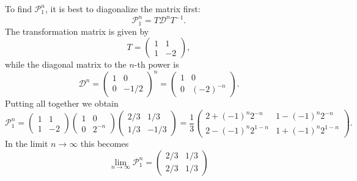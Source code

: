 \documentclass{gulartcl}
\begin{document}
To find $\mathcal{P}_1^{n}$, it is best to diagonalize the matrix first:
\begin{equation}
    \mathcal{P}_{1}^{n} = T \mathcal{D}^{n} T^{-1}.
\end{equation}
The transformation matrix is given by
\begin{equation}
    T =
    \begin{pmatrix}
        1 & 1 \\
        1 & -2
    \end{pmatrix},
\end{equation}
while the diagonal matrix to the $n$-th power is
\begin{equation}
    \mathcal{D}^{n} =
    \begin{pmatrix}
        1 & 0 \\
        0 & -1/2
    \end{pmatrix}^n
    =
    \begin{pmatrix}
        1 & 0 \\
        0 & (-2)^{-n}
    \end{pmatrix}.
\end{equation}
Putting all together we obtain
\begin{equation}
    \mathcal{P}_{1}^{n} =
    \begin{pmatrix}
        1 & 1 \\
        1 & -2
    \end{pmatrix}
    \begin{pmatrix}
        1 & 0 \\
        0 & 2^{-n}
    \end{pmatrix}
    \begin{pmatrix}
        2/3 & 1/3 \\
        1/3 & -1/3
    \end{pmatrix}
    =\frac{1}{3}
    \begin{pmatrix}
        2 + (-1)^{n} 2^{-n} & 1 - (-1)^{n} 2^{-n} \\
        2 - (-1)^{n} 2^{1-n} & 1 + (-1)^{n} 2^{1-n}
    \end{pmatrix}.
\end{equation}
In the limit $n\to \infty$ this becomes
\begin{equation}
    \lim_{n \to \infty} \mathcal{P}_{1}^{n} =
    \begin{pmatrix}
        2/3 & 1/3 \\
        2/3 & 1/3
    \end{pmatrix}
\end{equation}
\end{document}
